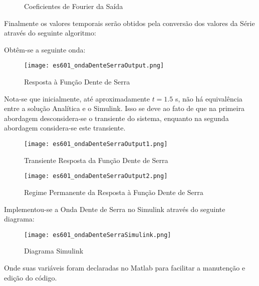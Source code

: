 \documentclass{article}
\begin{document}
\begin{resolution}
\begin{figure}[H]
            \caption{Coeficientes de Fourier da Saída}
        \end{figure}
\newpage
        Finalmente os valores temporais serão obtidos pela conversão dos valores da Série através do seguinte algoritmo:
        \begin{scriptsize}
            \myOctave
        \end{scriptsize} 
        Obtêm-se a seguinte onda:
        \begin{figure}[H]
            \centering
            \texttt{[image: es601\_ondaDenteSerraOutput.png]}
            \caption{Resposta à Função Dente de Serra}
        \end{figure}
        Nota-se que inicialmente, até aproximadamente $t = 1.5$ s, não há equivalência entre a solução Analítica e o Simulink. Isso se deve ao fato de que na primeira abordagem desconsidera-se o transiente do sistema, enquanto na segunda abordagem considera-se este transiente.
\newpage
        \begin{figure}[H]
            \centering
            \texttt{[image: es601\_ondaDenteSerraOutput1.png]}
            \caption{Transiente Resposta da Função Dente de Serra}
        \end{figure}
        \begin{figure}[H]
            \centering
            \texttt{[image: es601\_ondaDenteSerraOutput2.png]}
            \caption{Regime Permanente da Resposta à Função Dente de Serra}
        \end{figure}
\newpage
        Implementou-se a Onda Dente de Serra no Simulink através do seguinte diagrama:
        \begin{figure}[H]
            \centering
            \texttt{[image: es601\_ondaDenteSerraSimulink.png]}
            \caption{Diagrama Simulink}
        \end{figure}
        Onde suas variáveis foram declaradas no Matlab para facilitar a manutenção e edição do código.
    \end{resolution}
\end{document}
